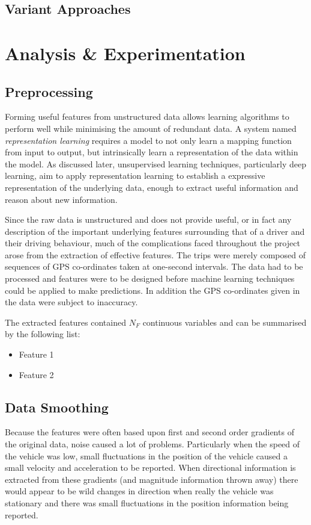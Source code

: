 \documentclass[a4paper, 11pt, twocolumn]{report}
\begin{document}
\subsection{Variant Approaches}






\section{Analysis \& Experimentation}

\subsection{Preprocessing}

Forming useful features from unstructured data allows learning algorithms to perform well while minimising the amount of redundant data. A system named \textit{representation learning} requires a model to not only learn a mapping function from input to output, but intrinsically learn a representation of the data within the model. As discussed later, unsupervised learning techniques, particularly deep learning, aim to apply representation learning to establish a expressive representation of the underlying data, enough to extract useful information and reason about new information.

Since the raw data is unstructured and does not provide useful, or in fact any description of the important underlying features surrounding that of a driver and their driving behaviour, much of the complications faced throughout the project arose from the extraction of effective features. The trips were merely composed of sequences of GPS co-ordinates taken at one-second intervals. The data had to be processed and features were to be designed before machine learning techniques could be applied to make predictions. In addition the GPS co-ordinates given in the data were subject to inaccuracy. 

The extracted features contained $N_F$ continuous variables and can be summarised by the following list:

\begin{itemize}
\item Feature 1
\item Feature 2
\end{itemize}


\subsection{Data Smoothing}
Because the features were often based upon first and second order gradients of the original data, noise caused a lot of problems. Particularly when the speed of the vehicle was low, small fluctuations in the position of the vehicle caused a small velocity and acceleration to be reported. When directional information is extracted from these gradients (and magnitude information thrown away) there would appear to be wild changes in direction when really the vehicle was stationary and there was small fluctuations in the position information being reported. 
\end{document}
